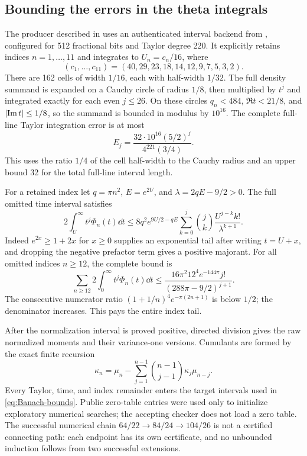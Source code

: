 \subsection{Bounding the errors in the theta integrals}
The producer described in \cite[\texttt{theta/SOURCE26.md}]{R1003} uses an authenticated interval backend from \cite{R994}, configured for 512 fractional bits and Taylor degree 220. It explicitly retains indices $n=1,\ldots,11$ and integrates to $U_n=c_n/16$, where
\[
 (c_1,\ldots,c_{11})=(40,29,23,18,14,12,9,7,5,3,2).
\]
There are 162 cells of width $1/16$, each with half-width $1/32$. The full density summand is expanded on a Cauchy circle of radius $1/8$, then multiplied by $t^j$ and integrated exactly for each even $j\le26$. On these circles $q_n<484$, $\Re t<21/8$, and $\lvert\operatorname{Im} t\rvert\le1/8$, so the summand is bounded in modulus by $10^{16}$. The complete full-line Taylor integration error is at most
\begin{equation}\label{eq:theta-Taylor-error}
 E_j=\frac{32\cdot10^{16}(5/2)^j}{4^{221}(3/4)}.
\end{equation}
This uses the ratio $1/4$ of the cell half-width to the Cauchy radius and an upper bound 32 for the total full-line interval length.

For a retained index let $q=\pi n^2$, $E=e^{2U}$, and $\lambda=2qE-9/2>0$. The full omitted time interval satisfies
\begin{equation}\label{eq:theta-time-error}
 2\int_U^\infty t^j\Phi_n(t)\dd t
 \le8q^2e^{9U/2-qE}
       \sum_{k=0}^j\binom jk\frac{U^{j-k}k!}{\lambda^{k+1}}.
\end{equation}
Indeed $e^{2x}\ge1+2x$ for $x\ge0$ supplies an exponential tail after writing $t=U+x$, and dropping the negative prefactor term gives a positive majorant. For all omitted indices $n\ge12$, the complete bound is
\begin{equation}\label{eq:theta-index-error}
 \sum_{n\ge12}2\int_0^\infty t^j\Phi_n(t)\dd t
 \le\frac{16\pi^2 12^4e^{-144\pi}j!}{(288\pi-9/2)^{j+1}}.
\end{equation}
The consecutive numerator ratio $(1+1/n)^4e^{-\pi(2n+1)}$ is below $1/2$; the denominator increases. This pays the entire index tail.

After the normalization interval is proved positive, directed division gives the raw normalized moments and their variance-one versions. Cumulants are formed by the exact finite recursion
\[
 \kappa_n=\mu_n-\sum_{j=1}^{n-1}\binom{n-1}{j-1}\kappa_j\mu_{n-j}.
\]
Every Taylor, time, and index remainder enters the target intervals used in \eqref{eq:Banach-bounds}. Public zero-table entries were used only to initialize exploratory numerical searches; the accepting checker does not load a zero table. The successful numerical chain $64/22\to84/24\to104/26$ is not a certified connecting path: each endpoint has its own certificate, and no unbounded induction follows from two successful extensions.

